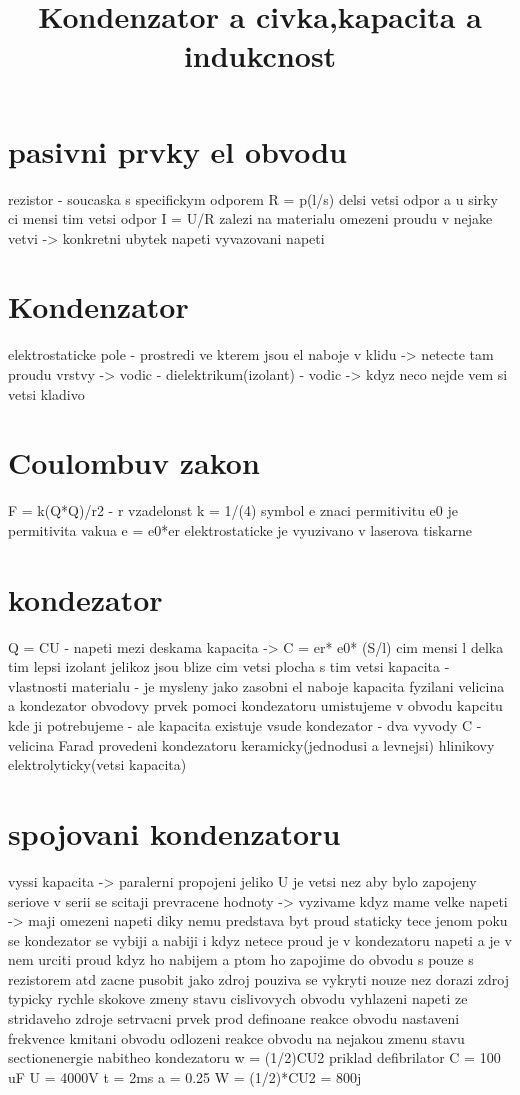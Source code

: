 \documentclass{article}
\begin{document}
\sloppy
\title{Kondenzator a civka,kapacita a indukcnost}
\section{pasivni prvky el obvodu}
rezistor - soucaska s specifickym odporem
R = p(l/s) delsi vetsi odpor a u sirky ci mensi tim vetsi odpor
I = U/R
zalezi na materialu
omezeni proudu v nejake vetvi -> konkretni ubytek napeti
vyvazovani napeti
\section{Kondenzator}
elektrostaticke pole - prostredi ve kterem jsou el naboje v klidu -> netecte tam proudu
vrstvy -> vodic - dielektrikum(izolant) - vodic -> kdyz neco nejde vem si vetsi kladivo
\section{Coulombuv zakon}
F = k(Q*Q)/r2 - r vzadelonst
k = 1/(4\pi * \e)
symbol e znaci permitivitu
e0 je permitivita vakua
e = e0*er
elektrostaticke je vyuzivano v laserova tiskarne
\section{kondezator}
Q = CU - napeti mezi deskama
kapacita -> C = er* e0* (S/l) cim mensi l delka tim lepsi izolant jelikoz
jsou blize
cim vetsi plocha s tim vetsi kapacita
- vlastnosti materialu
- je mysleny jako zasobni el naboje
kapacita fyzilani velicina a kondezator obvodovy prvek
pomoci kondezatoru umistujeme v obvodu kapcitu kde ji potrebujeme
- ale kapacita existuje vsude
kondezator - dva vyvody
C - velicina Farad
provedeni kondezatoru keramicky(jednodusi a levnejsi)
hlinikovy elektrolyticky(vetsi kapacita)
\section{spojovani kondenzatoru}
vyssi kapacita -> paralerni propojeni jeliko U je vetsi nez aby bylo zapojeny seriove
v serii se scitaji prevracene hodnoty -> vyzivame kdyz mame velke napeti -> maji omezeni napeti
diky nemu predstava byt proud staticky tece jenom poku se kondezator se vybiji a nabiji
i kdyz netece proud je v kondezatoru napeti a je v nem urciti proud
kdyz ho nabijem a ptom ho zapojime do obvodu s pouze s rezistorem atd zacne pusobit jako zdroj
pouziva se vykryti nouze nez dorazi zdroj
    typicky rychle skokove zmeny stavu cislivovych obvodu
    vyhlazeni napeti ze stridaveho zdroje
setrvacni prvek
     prod definoane reakce obvodu
     nastaveni frekvence kmitani obvodu
     odlozeni reakce obvodu na nejakou zmenu stavu
section{energie nabitheo kondezatoru}
w = (1/2)CU2
priklad defibrilator
C = 100 uF
U = 4000V
t = 2ms
a = 0.25    W = (1/2)*CU2 = 800j
\end{document}
